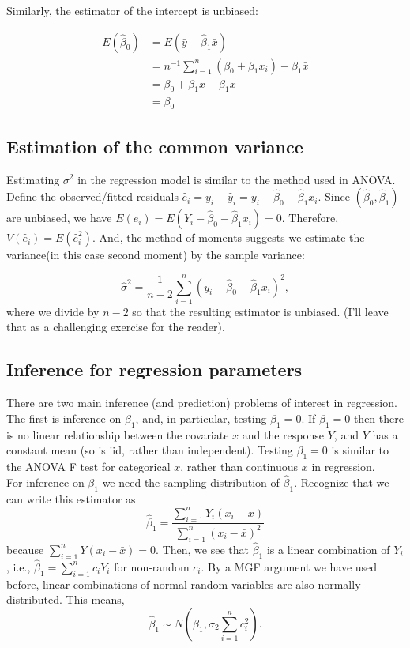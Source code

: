 \documentclass[
]{book}
\begin{document}
Similarly, the estimator of the intercept is unbiased:

\[
\begin{aligned}
E(\hat\beta_0) & = E(\bar y - \hat\beta_1 \bar x)\\
& = n^{-1}\sum_{i=1}^n (\beta_0 + \beta_1x_i) - \beta_1 \bar x\\
& = \beta_0 + \beta_1 \bar x - \beta_1 \bar x\\
& = \beta_0
\end{aligned}
\]

\hypertarget{estimation-of-the-common-variance}{%
\subsection{Estimation of the common variance}\label{estimation-of-the-common-variance}}

Estimating \(\sigma^2\) in the regression model is similar to the method used in ANOVA. Define the observed/fitted residuals \(\hat e_i = y_i - \hat y_i = y_i - \hat\beta_0 - \hat\beta_1 x_i\). Since \((\hat\beta_0, \hat\beta_1)\) are unbiased, we have \(E(\hat e_i) = E(Y_i - \hat\beta_0 - \hat\beta_1 x_i) = 0\). Therefore, \(V(\hat e_i) = E(\hat e_i ^2)\). And, the method of moments suggests we estimate the variance(in this case second moment) by the sample variance:

\[\hat\sigma^2 = \frac{1}{n-2}\sum_{i=1}^n (y_i - \hat\beta_0 - \hat\beta_1 x_i)^2,\]
where we divide by \(n-2\) so that the resulting estimator is unbiased. (I'll leave that as a challenging exercise for the reader).

\hypertarget{inference-for-regression-parameters}{%
\subsection{Inference for regression parameters}\label{inference-for-regression-parameters}}

There are two main inference (and prediction) problems of interest in regression. The first is inference on \(\beta_1\), and, in particular, testing \(\beta_1 = 0\). If \(\beta_1=0\) then there is no linear relationship between the covariate \(x\) and the response \(Y\), and \(Y\) has a constant mean (so is iid, rather than independent). Testing \(\beta_1=0\) is similar to the ANOVA F test for categorical \(x\), rather than continuous \(x\) in regression.\\

For inference on \(\beta_1\) we need the sampling distribution of \(\hat\beta_1\). Recognize that we can write this estimator as
\[\hat\beta_1 = \frac{\sum_{i=1}^n Y_i(x_i - \bar x)}{\sum_{i=1}^n (x_i - \bar x)^2}\] because \(\sum_{i=1}^n \bar Y(x_i - \bar x) = 0\). Then, we see that \(\hat\beta_1\) is a linear combination of \(Y_i\), i.e., \(\hat\beta_1 = \sum_{i=1}^nc_i Y_i\) for non-random \(c_i\). By a MGF argument we have used before, linear combinations of normal random variables are also normally-distributed. This means,
\[\hat\beta_1 \sim N\left(\beta_1, \sigma_2\sum_{i=1}^n c_i^2\right).\]
\end{document}
